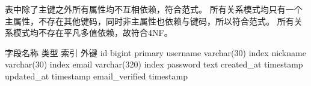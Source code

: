 {}\markdownRendererInterblockSeparator
{}表中除了主键之外所有属性均不互相依赖，符合范式。\markdownRendererInterblockSeparator
{}\markdownRendererInterblockSeparator
{}所有关系模式均只有一个主属性，不存在其他键码，同时非主属性也依赖与键码，所以符合范式。\markdownRendererInterblockSeparator
{}\markdownRendererInterblockSeparator
{}所有关系模式均不存在平凡多值依赖，故符合4NF。\markdownRendererInterblockSeparator
{}\markdownRendererInterblockSeparator
{}\markdownRendererInterblockSeparator
{}\begin{center}\markdownRendererInterblockSeparator
{}%
{{字段名称}%
{类型}%
{索引}%
{外键}%
}%
{{id}%
{bigint}%
{primary}%
{}%
}%
{{username}%
{varchar(30)}%
{index}%
{}%
}%
{{nickname}%
{varchar(30)}%
{index}%
{}%
}%
{{email}%
{varchar(320)}%
{index}%
{}%
}%
{{password}%
{text}%
{}%
{}%
}%
{{created\_at}%
{timestamp}%
{}%
{}%
}%
{{updated\_at}%
{timestamp}%
{}%
{}%
}%
{{email\_verified}%
{timestamp}%
{}%
{}%
}%
\markdownRendererInterblockSeparator
{}\end{center}\relax